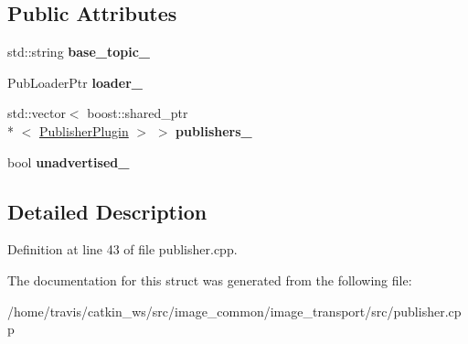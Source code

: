 \subsection*{Public Attributes}
\begin{DoxyCompactItemize}
\item 
\hypertarget{structimage__transport_1_1_publisher_1_1_impl_af60a4aa961dd8b452809756a4c8c8163}{std\-::string {\bfseries base\-\_\-topic\-\_\-}}\label{structimage__transport_1_1_publisher_1_1_impl_af60a4aa961dd8b452809756a4c8c8163}

\item 
\hypertarget{structimage__transport_1_1_publisher_1_1_impl_aaed1c0cb6c19b601daaa2e14596c5d83}{Pub\-Loader\-Ptr {\bfseries loader\-\_\-}}\label{structimage__transport_1_1_publisher_1_1_impl_aaed1c0cb6c19b601daaa2e14596c5d83}

\item 
\hypertarget{structimage__transport_1_1_publisher_1_1_impl_a8f76f925d46b3770fcd29a4799858502}{std\-::vector$<$ boost\-::shared\-\_\-ptr\\*
$<$ \hyperlink{classimage__transport_1_1_publisher_plugin}{Publisher\-Plugin} $>$ $>$ {\bfseries publishers\-\_\-}}\label{structimage__transport_1_1_publisher_1_1_impl_a8f76f925d46b3770fcd29a4799858502}

\item 
\hypertarget{structimage__transport_1_1_publisher_1_1_impl_ae0cb1a8d1f7693ef7f6759274c435975}{bool {\bfseries unadvertised\-\_\-}}\label{structimage__transport_1_1_publisher_1_1_impl_ae0cb1a8d1f7693ef7f6759274c435975}

\end{DoxyCompactItemize}


\subsection{Detailed Description}


Definition at line 43 of file publisher.\-cpp.



The documentation for this struct was generated from the following file\-:\begin{DoxyCompactItemize}
\item 
/home/travis/catkin\-\_\-ws/src/image\-\_\-common/image\-\_\-transport/src/publisher.\-cpp\end{DoxyCompactItemize}
